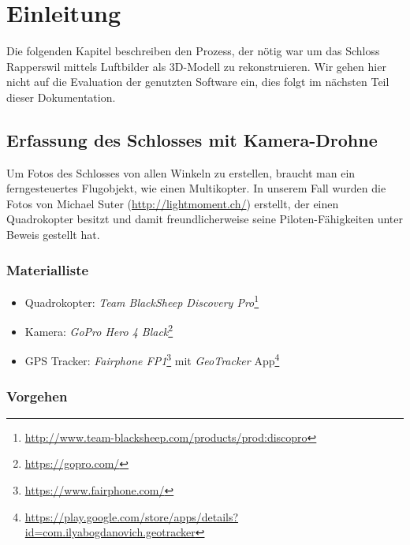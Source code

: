 \chapter{Einleitung}


Die folgenden Kapitel beschreiben den Prozess, der nötig war um das Schloss
Rapperswil mittels Luftbilder als 3D-Modell zu rekonstruieren. Wir gehen hier
nicht auf die Evaluation der genutzten Software ein, dies folgt im nächsten Teil
dieser Dokumentation.


\section{Erfassung des Schlosses mit Kamera-Drohne}

\label{workflow:drone}

Um Fotos des Schlosses von allen Winkeln zu erstellen, braucht man ein
ferngesteuertes Flugobjekt, wie \zb{} einen Multikopter. In unserem Fall wurden
die Fotos von Michael Suter (\url{http://lightmoment.ch/}) erstellt, der einen
Quadrokopter besitzt und damit freundlicherweise seine Piloten-Fähigkeiten unter
Beweis gestellt hat.

\subsection{Materialliste}

\begin{itemize}
	\item Quadrokopter: \textit{Team BlackSheep Discovery
		Pro}\footnote{\url{http://www.team-blacksheep.com/products/prod:discopro}}
	\item Kamera: \textit{GoPro Hero 4 Black}\footnote{\url{https://gopro.com/}}
	\item GPS Tracker: \textit{Fairphone
		FP1}\footnote{\url{https://www.fairphone.com/}} mit
		\textit{GeoTracker}
		App\footnote{\url{https://play.google.com/store/apps/details?id=com.ilyabogdanovich.geotracker}}
\end{itemize}

\subsection{Vorgehen}

